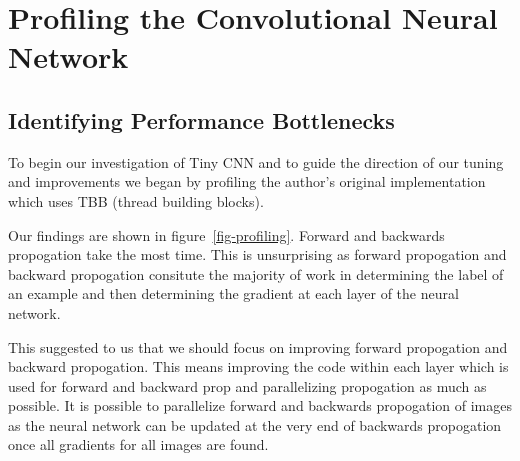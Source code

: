 
\section{Profiling the Convolutional Neural Network}
\label{sec-profiling}



\subsection{Identifying Performance Bottlenecks}

To begin our investigation of Tiny CNN and to guide the direction of our tuning and improvements we began by profiling the author's original implementation which uses TBB (thread building blocks).

Our findings are shown in figure~\ref{fig-profiling}. Forward and backwards propogation take the most time. This is unsurprising as forward propogation and backward propogation consitute the majority of work in determining the label of an example and then determining the gradient at each layer of the neural network.

This suggested to us that we should focus on improving forward propogation and backward propogation. This means improving the code within each layer which is used for forward and backward prop and parallelizing propogation as much as possible. It is possible to parallelize forward and backwards propogation of images as the neural network can be updated at the very end of backwards propogation once all gradients for all images are found.
